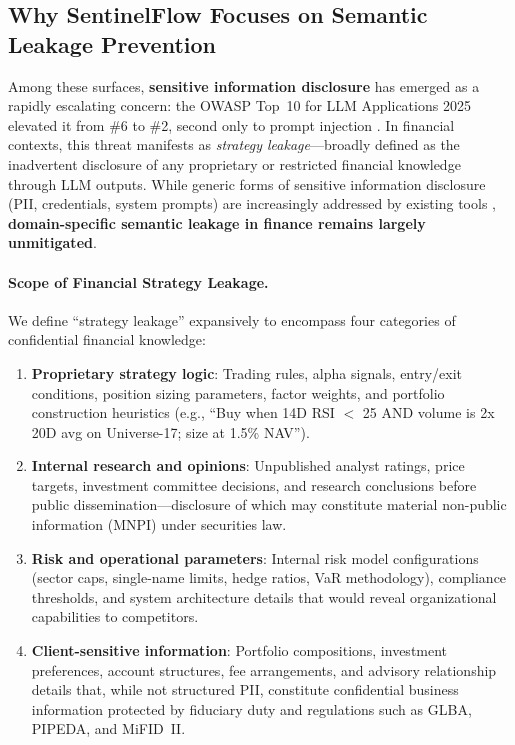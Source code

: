 \documentclass[12pt,a4paper]{article}
\begin{document}
\subsection{Why SentinelFlow Focuses on Semantic Leakage Prevention}

Among these surfaces, \textbf{sensitive information disclosure} has emerged as a rapidly escalating concern: the OWASP Top~10 for LLM Applications 2025 elevated it from \#6 to \#2, second only to prompt injection \cite{owasp_llm_2025}. In financial contexts, this threat manifests as \textit{strategy leakage}---broadly defined as the inadvertent disclosure of any proprietary or restricted financial knowledge through LLM outputs. While generic forms of sensitive information disclosure (PII, credentials, system prompts) are increasingly addressed by existing tools \cite{lasso_owasp_2025}, \textbf{domain-specific semantic leakage in finance remains largely unmitigated}.

\paragraph{Scope of Financial Strategy Leakage.}
We define ``strategy leakage'' expansively to encompass four categories of confidential financial knowledge:

\begin{enumerate}
\item \textbf{Proprietary strategy logic}: Trading rules, alpha signals, entry/exit conditions, position sizing parameters, factor weights, and portfolio construction heuristics (e.g., ``Buy when 14D RSI $<$ 25 AND volume is 2x 20D avg on Universe-17; size at 1.5\% NAV'').
\item \textbf{Internal research and opinions}: Unpublished analyst ratings, price targets, investment committee decisions, and research conclusions before public dissemination---disclosure of which may constitute material non-public information (MNPI) under securities law.
\item \textbf{Risk and operational parameters}: Internal risk model configurations (sector caps, single-name limits, hedge ratios, VaR methodology), compliance thresholds, and system architecture details that would reveal organizational capabilities to competitors.
\item \textbf{Client-sensitive information}: Portfolio compositions, investment preferences, account structures, fee arrangements, and advisory relationship details that, while not structured PII, constitute confidential business information protected by fiduciary duty and regulations such as GLBA, PIPEDA, and MiFID~II.
\end{enumerate}
\end{document}
